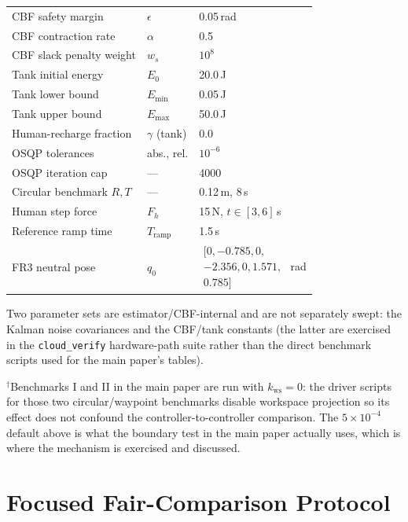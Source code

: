 \documentclass[journal]{IEEEtran}
\begin{document}
\begin{table}[!t]
\begin{tabular}{p{2.3cm}p{1.2cm}p{2.5cm}}
CBF safety margin & $\epsilon$ & 0.05\,rad\\
CBF contraction rate & $\alpha$ & 0.5\\
CBF slack penalty weight & $w_s$ & $10^{8}$\\
Tank initial energy & $E_0$ & 20.0\,J\\
Tank lower bound & $E_\text{min}$ & 0.05\,J\\
Tank upper bound & $E_\text{max}$ & 50.0\,J\\
Human-recharge fraction & $\gamma$ (tank) & 0.0\\
OSQP tolerances & abs., rel. & $10^{-6}$\\
OSQP iteration cap & --- & 4000\\
Circular benchmark $R,T$ & --- & 0.12\,m, 8\,s\\
Human step force & $F_h$ & 15\,N, $t\in[3,6]$\,s\\
Reference ramp time & $T_\text{ramp}$ & 1.5\,s\\
FR3 neutral pose & $q_0$ &
$\begin{array}{c}[0,-0.785,0,\\-2.356,0,1.571,\\0.785]\end{array}$ rad\\
\bottomrule
\end{tabular}
\end{table}

Two parameter sets are estimator/CBF-internal and are not separately
swept: the Kalman noise covariances and the CBF/tank constants (the
latter are exercised in the \texttt{cloud\_verify} hardware-path suite
rather than the direct benchmark scripts used for the main paper's
tables).

$^\dagger$Benchmarks I and II in the main paper are run with
$k_\text{ws}=0$: the driver scripts
for those two circular/waypoint benchmarks disable workspace projection
so its effect does not confound the controller-to-controller
comparison. The $5\times10^{-4}$ default above is what the boundary
test in the main paper actually uses, which is where the
mechanism is exercised and discussed.

\section{Focused Fair-Comparison Protocol}\label{sec:fair}
\end{document}
